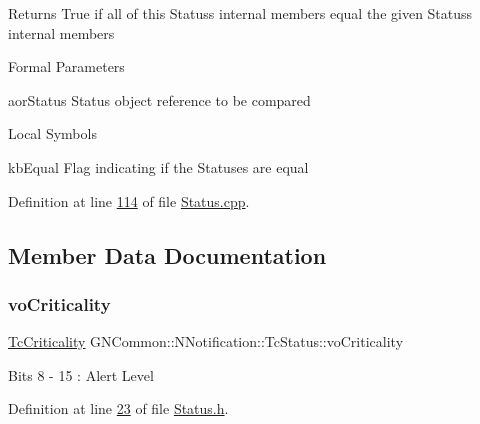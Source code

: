 \begin{DoxyReturn}{Returns}
True if all of this Status\textquotesingle{}s internal members equal the given Status\textquotesingle{}s internal members
\end{DoxyReturn}
\begin{DoxyParagraph}{Formal Parameters}

\begin{DoxyPre}{\ttfamily [ in ]  aorStatus    Status object reference to be compared }\end{DoxyPre}

\end{DoxyParagraph}
\begin{DoxyParagraph}{Local Symbols}

\begin{DoxyPre}{\ttfamily  kbEqual    Flag indicating if the Statuses are equal }\end{DoxyPre}
 
\end{DoxyParagraph}


Definition at line \mbox{\hyperlink{_status_8cpp_source_l00114}{114}} of file \mbox{\hyperlink{_status_8cpp_source}{Status.\+cpp}}.



\subsection{Member Data Documentation}
\mbox{\label{class_g_n_common_1_1_n_notification_1_1_tc_status_a2f8cb2528ae8cba51e3acc7f28eb2eeb}} 
\subsubsection{\texorpdfstring{vo\+Criticality}{voCriticality}}
{\footnotesize\ttfamily \mbox{\hyperlink{namespace_g_n_common_1_1_n_notification_a7d5c0650483fe26fa420ae5bf787566b}{Tc\+Criticality}} G\+N\+Common\+::\+N\+Notification\+::\+Tc\+Status\+::vo\+Criticality}

Bits 8 -\/ 15 \+: Alert Level 

Definition at line \mbox{\hyperlink{_status_8h_source_l00023}{23}} of file \mbox{\hyperlink{_status_8h_source}{Status.\+h}}.

